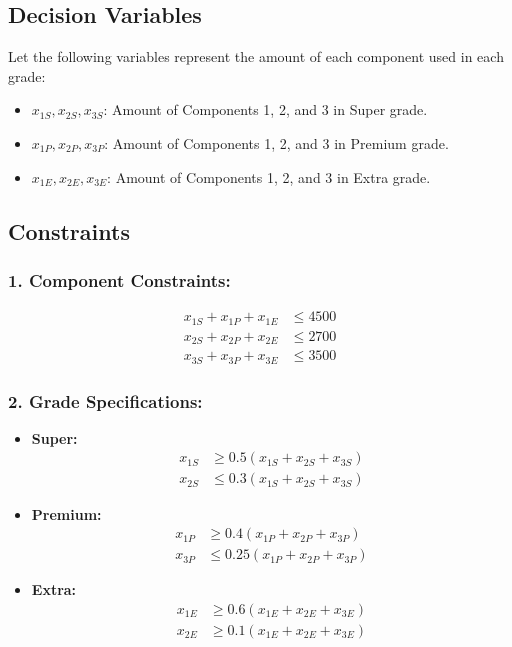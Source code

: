 \documentclass[12pt]{article}
\begin{document}
\subsection*{ Decision Variables}
\noindent Let the following variables represent the amount of each component used in each grade:
\begin{itemize}
    \item \( x_{1S}, x_{2S}, x_{3S} \): Amount of Components 1, 2, and 3 in Super grade.
    \item \( x_{1P}, x_{2P}, x_{3P} \): Amount of Components 1, 2, and 3 in Premium grade.
    \item \( x_{1E}, x_{2E}, x_{3E} \): Amount of Components 1, 2, and 3 in Extra grade.
\end{itemize}

\subsection*{ Constraints}

\subsubsection*{1. Component Constraints:}
\begin{align*}
x_{1S} + x_{1P} + x_{1E} &\leq 4500 \\
x_{2S} + x_{2P} + x_{2E} &\leq 2700 \\
x_{3S} + x_{3P} + x_{3E} &\leq 3500
\end{align*}

\subsubsection*{2. Grade Specifications:}
\begin{itemize}
    \item \textbf{Super:}
    \begin{align*}
    x_{1S} &\geq 0.5(x_{1S} + x_{2S} + x_{3S}) \\
    x_{2S} &\leq 0.3(x_{1S} + x_{2S} + x_{3S})
    \end{align*}
    \item \textbf{Premium:}
    \begin{align*}
    x_{1P} &\geq 0.4(x_{1P} + x_{2P} + x_{3P}) \\
    x_{3P} &\leq 0.25(x_{1P} + x_{2P} + x_{3P})
    \end{align*}
    \item \textbf{Extra:}
    \begin{align*}
    x_{1E} &\geq 0.6(x_{1E} + x_{2E} + x_{3E}) \\
    x_{2E} &\geq 0.1(x_{1E} + x_{2E} + x_{3E})
    \end{align*}
\end{itemize}
\end{document}
